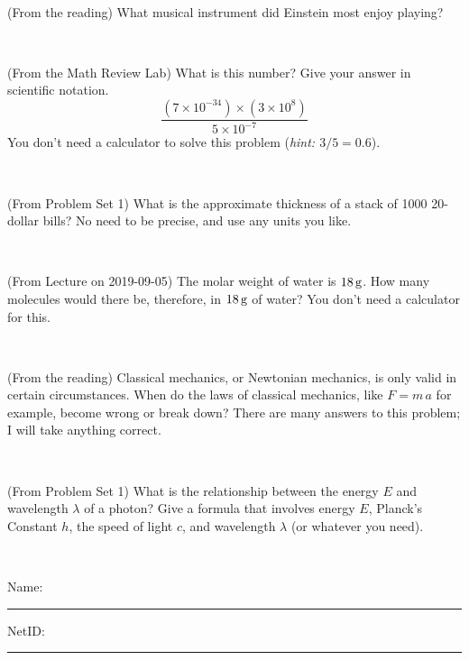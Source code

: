 \documentclass[12pt, letterpaper]{article}
\begin{document}
\vfill ~

\begin{problem} (From the reading)
What musical instrument did Einstein most enjoy playing?
\end{problem}


\vfill ~

\begin{problem} (From the Math Review Lab)
What is this number? Give your answer in scientific notation.
$$
\frac{(7\times10^{-34})\times(3\times10^8)}{5\times10^{-7}}
$$
You don't need a calculator to solve this problem (\textit{hint: $3/5=0.6$}).
\end{problem}


\vfill ~


\clearpage


\begin{problem} (From Problem Set 1)
What is the approximate thickness of a stack of 1000 20-dollar bills?
No need to be precise, and use any units you like.
\end{problem}


\vfill ~

\begin{problem} (From Lecture on 2019-09-05)
The molar weight of water is $18\,\mathrm{g}$. How many molecules would there
be, therefore, in $18\,\mathrm{g}$ of water? You don't need a calculator for
this.
\end{problem}


\vfill ~

\begin{problem} (From the reading)
Classical mechanics, or Newtonian mechanics, is only valid in certain
circumstances. When do the laws of classical mechanics, like $F =
m\,a$ for example, become wrong or break down? There are many answers
to this problem; I will take anything correct.
\end{problem}


\vfill ~

\begin{problem} (From Problem Set 1)
What is the relationship between the energy $E$ and wavelength
$\lambda$ of a photon? Give a formula that involves energy $E$,
Planck's Constant $h$, the speed of light $c$, and wavelength
$\lambda$ (or whatever you need).
\end{problem}

\vfill ~


\cleardoublepage



\noindent
Name: \rule[-1ex]{0.60\textwidth}{0.1pt}
NetID: \rule[-1ex]{0.20\textwidth}{0.1pt}
\end{document}
